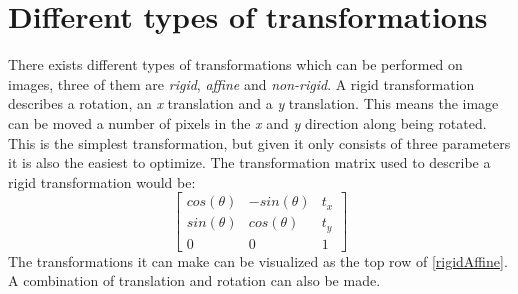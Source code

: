 \section{Different types of transformations}
There exists different types of transformations which can be performed on images, three of them are \textit{rigid}, \textit{affine} and \textit{non-rigid}. A rigid transformation describes a rotation, an \textit{x} translation and a \textit{y} translation. This means the image can be moved a number of pixels in the \textit{x} and \textit{y} direction along being rotated. This is the simplest transformation, but given it only consists of three parameters it is also the easiest to optimize. The transformation matrix used to describe a rigid transformation would be:
\begin{equation*}
	\begin{bmatrix}
		cos(\theta) & -sin(\theta) & t_x \\
		sin(\theta)  &  cos(\theta) & t_y \\
		0				 & 0				 & 1
	\end{bmatrix}
\end{equation*}
The transformations it can make can be visualized as the top row of \autoref{rigidAffine}. A combination of translation and rotation can also be made.

